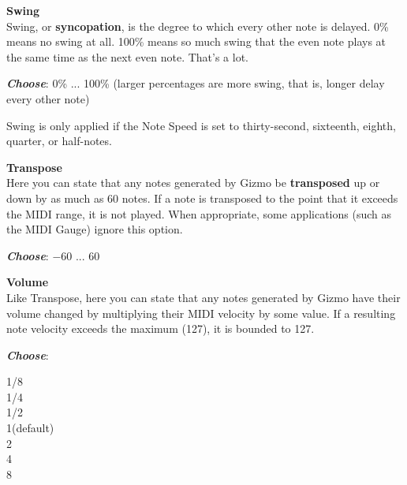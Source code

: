\documentclass{article}
\begin{document}
\begin{description}
	\item{\bf Swing}\\
			Swing, or {\bf syncopation}, is the degree to which every other note is delayed.  0\% means no swing at all.  100\% means so much swing that the even note plays at the same time as the next even note.  That's a lot.
		\begin{description}
		\item{\bf \textit{Choose}}: 0\% ... 100\% (larger percentages are more swing, that is, longer delay every other note)
		\end{description}

		Swing is only applied if the Note Speed is set to thirty-second, sixteenth, eighth, quarter, or half-notes.

	\item{\bf Transpose}\\
		Here you can state that any notes generated by Gizmo be {\bf transposed} up or down by as much as 60 notes. If a note is transposed to the point that it exceeds the MIDI range, it is not played.  When appropriate, some applications (such as the MIDI Gauge) ignore this option. 
		\begin{description}
		\item{\bf \textit{Choose}}: \(-60\) ... 60 
		\end{description}

	\item{\bf Volume}\\
		Like Transpose, here you can state that any notes generated by Gizmo have their volume changed by multiplying their MIDI velocity by some value.  If a resulting note velocity exceeds the maximum (127), it is bounded to 127.
			
			\begin{description}
			\item{\bf \textit{Choose}}:
			\begin{tabbing}
			1/8\\
			1/4\\
			1/2\hspace{3.65in}\\
			1(default)\\
			2\\
			4\\
			8\\
			\end{tabbing}
		\end{description}


\end{description}
\end{document}
